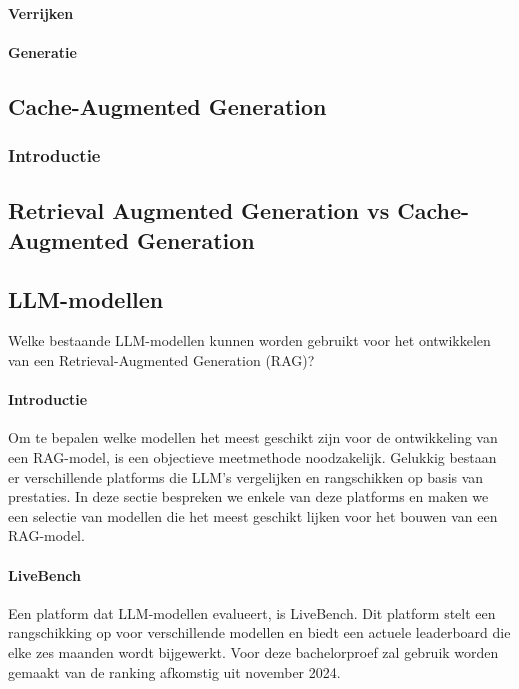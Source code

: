     \paragraph{Verrijken}
    \paragraph{Generatie}
        
    
    
    
    \subsection{Cache-Augmented Generation}
    \subsubsection{Introductie}
    
    \subsection{Retrieval Augmented Generation vs Cache-Augmented Generation}
    
    
    \subsection{LLM-modellen}
    Welke bestaande LLM-modellen kunnen worden gebruikt voor het ontwikkelen van een Retrieval-Augmented Generation (RAG)? 
    
    
    \paragraph{Introductie}
    Om te bepalen welke modellen het meest geschikt zijn voor de ontwikkeling van een RAG-model, is een objectieve meetmethode noodzakelijk. Gelukkig bestaan er verschillende platforms die LLM's vergelijken en rangschikken op basis van prestaties. In deze sectie bespreken we enkele van deze platforms en maken we een selectie van modellen die het meest geschikt lijken voor het bouwen van een RAG-model.
    
    
    \paragraph{LiveBench} 
    Een platform dat LLM-modellen evalueert, is LiveBench. Dit platform stelt een rangschikking op voor verschillende modellen en biedt een actuele leaderboard die elke zes maanden wordt bijgewerkt. Voor deze bachelorproef zal gebruik worden gemaakt van de ranking afkomstig uit november 2024.
    
